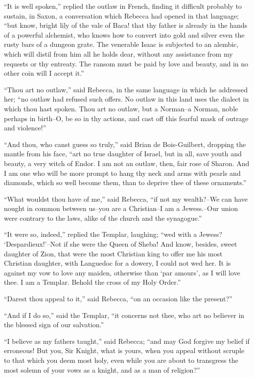 ``It is well spoken,'' replied the outlaw in French, finding it
difficult probably to sustain, in Saxon, a conversation which Rebecca
had opened in that language; ``but know, bright lily of the vale of
Baca! that thy father is already in the hands of a powerful alchemist,
who knows how to convert into gold and silver even the rusty bars of a
dungeon grate. The venerable Isaac is subjected to an alembic, which
will distil from him all he holds dear, without any assistance from my
requests or thy entreaty. The ransom must be paid by love and beauty,
and in no other coin will I accept it.''

``Thou art no outlaw,'' said Rebecca, in the same language in which he
addressed her; ``no outlaw had refused such offers. No outlaw in this
land uses the dialect in which thou hast spoken. Thou art no outlaw, but
a Norman--a Norman, noble perhaps in birth--O, be so in thy actions, and
cast off this fearful mask of outrage and violence!''

``And thou, who canst guess so truly,'' said Brian de Bois-Guilbert,
dropping the mantle from his face, ``art no true daughter of Israel, but
in all, save youth and beauty, a very witch of Endor. I am not an
outlaw, then, fair rose of Sharon. And I am one who will be more prompt
to hang thy neck and arms with pearls and diamonds, which so well become
them, than to deprive thee of these ornaments.''

``What wouldst thou have of me,'' said Rebecca, ``if not my wealth?--We
can have nought in common between us--you are a Christian--I am a
Jewess.--Our union were contrary to the laws, alike of the church and
the synagogue.''

``It were so, indeed,'' replied the Templar, laughing; ``wed with a
Jewess? `Despardieux!'--Not if she were the Queen of Sheba! And know,
besides, sweet daughter of Zion, that were the most Christian king to
offer me his most Christian daughter, with Languedoc for a dowery, I
could not wed her. It is against my vow to love any maiden, otherwise
than `par amours', as I will love thee. I am a Templar. Behold the cross
of my Holy Order.''

``Darest thou appeal to it,'' said Rebecca, ``on an occasion like the
present?''

``And if I do so,'' said the Templar, ``it concerns not thee, who art no
believer in the blessed sign of our salvation.''

``I believe as my fathers taught,'' said Rebecca; ``and may God forgive
my belief if erroneous! But you, Sir Knight, what is yours, when you
appeal without scruple to that which you deem most holy, even while you
are about to transgress the most solemn of your vows as a knight, and as
a man of religion?''

